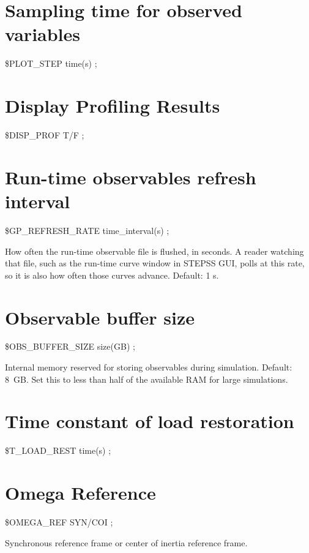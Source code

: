 \section{Sampling time for observed variables}

\$PLOT\_STEP time(s) ;

\section{Display Profiling Results}

\$DISP\_PROF T/F ; 

\section{Run-time observables refresh
	interval}

\$GP\_REFRESH\_RATE time\_interval(s) ;

How often the run-time observable file is flushed, in seconds. A reader watching
that file, such as the run-time curve window in STEPSS GUI, polls at this rate,
so it is also how often those curves advance. Default: 1 s.


\section{Observable buffer size}

\$OBS\_BUFFER\_SIZE size(GB) ;

Internal memory reserved for storing observables during simulation.
Default: 8~GB. Set this to less than half of the available RAM for
large simulations.


\section{Time constant of load restoration}

 \$T\_LOAD\_REST time(s) ; 


\section{Omega Reference}

 \$OMEGA\_REF SYN/COI ; 

Synchronous reference frame or center of inertia reference frame.


